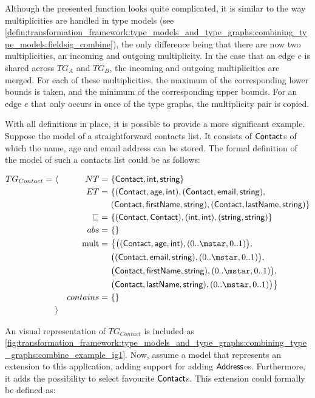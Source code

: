 Although the presented function looks quite complicated, it is similar to the way multiplicities are handled in type models (see \cref{defin:transformation_framework:type_models_and_type_graphs:combining_type_models:fieldsig_combine}), the only difference being that there are now two multiplicities, an incoming and outgoing multiplicity. In the case that an edge $e$ is shared across $TG_A$ and $TG_B$, the incoming and outgoing multiplicities are merged. For each of these multiplicities, the maximum of the corresponding lower bounds is taken, and the minimum of the corresponding upper bounds. For an edge $e$ that only occurs in once of the type graphs, the multiplicity pair is copied.

With all definitions in place, it is possible to provide a more significant example. Suppose the model of a straightforward contacts list. It consists of $\mathsf{Contact}$s of which the name, age and email address can be stored. The formal definition of the model of such a contacts list could be as follows:

\begin{align*}
TG_{Contact} =\ &\langle&
NT =\ &\{ \type{Contact}, \type{int}, \type{string} \} \\&&
ET =\ &\{ 
( \type{Contact}, \type{age}, \type{int} ),
( \type{Contact}, \type{email}, \type{string} ),\\&&&
( \type{Contact}, \type{firstName}, \type{string} ),
( \type{Contact}, \type{lastName}, \type{string} )
\} \\&&
\sqsubseteq\ =\ &\{
( \type{Contact}, \type{Contact} ),
( \type{int}, \type{int} ),
( \type{string}, \type{string} )
\} \\&&
abs =\ &\{\} \\&&
\mathrm{mult} =\ &\big\{
\big( ( \type{Contact}, \type{age}, \type{int} ), ( 0..\mstar, 0..1 ) \big),\\&&&
\big( ( \type{Contact}, \type{email}, \type{string} ), ( 0..\mstar, 0..1 ) \big),\\&&&
\big( \type{Contact}, \type{firstName}, \type{string} ), ( 0..\mstar, 0..1 ) \big),\\&&&
\big( \type{Contact}, \type{lastName}, \type{string} ), ( 0..\mstar, 0..1 ) \big)
\big\} \\&&
contains =\ &\{\} 
\\&\rangle
\end{align*}

An visual representation of $TG_{Contact}$ is included as  \cref{fig:transformation_framework:type_models_and_type_graphs:combining_type_graphs:combine_example_ig1}. Now, assume a model that represents an extension to this application, adding support for adding $\mathsf{Address}$es. Furthermore, it adds the possibility to select favourite $\mathsf{Contact}$s. This extension could formally be defined as:

